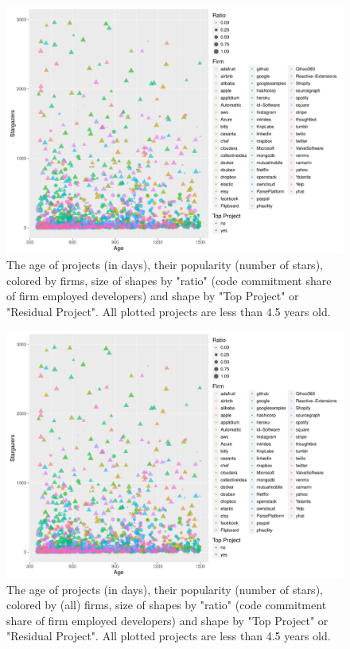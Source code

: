 \begin{landscape}
\begin{figure}
	\centering
	\label{fig:code_contribution_age_ratio}
	\includegraphics[page=1,scale=0.45]{../graphics/intro/code_contribution_age_ratio.pdf}
	\caption{The age of projects (in days), their popularity (number of stars), colored by firms, size of shapes by "ratio" (code commitment share of firm employed developers) and shape by "Top Project" or "Residual Project". All plotted projects are less than 4.5 years old.}
\end{figure}

\begin{figure}
	\centering
	\includegraphics[page=1,scale=0.45]{../graphics/intro/code_contribution_age_ratio.pdf}
	\caption{The age of projects (in days), their popularity (number of stars), colored by (all) firms, size of shapes by "ratio" (code commitment share of firm employed developers) and shape by "Top Project" or "Residual Project". All plotted projects are less than 4.5 years old.}
	\label{fig:code_contribution_age_ratio}
\end{figure}


\end{landscape}
